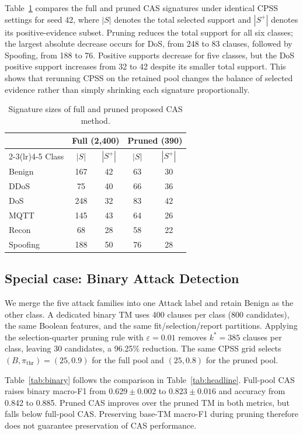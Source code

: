 \documentclass[conference]{IEEEtran}
\begin{document}
Table~\ref{tab:reduction} compares the full and pruned CAS signatures
under identical CPSS settings for seed 42, where $|S|$ denotes the
total selected support and $|S^+|$ denotes its positive-evidence subset.
Pruning reduces the total support for all six classes; the largest
absolute decrease occurs for DoS, from 248 to 83 clauses, followed by
Spoofing, from 188 to 76. Positive supports decrease for five classes,
but the DoS positive support increases from 32 to 42 despite its smaller
total support. This shows that rerunning CPSS on the retained pool
changes the balance of selected evidence rather than simply shrinking
each signature proportionally.

\begin{table}[!htb]
\centering
\caption{Signature sizes of full and pruned proposed CAS method.}
\label{tab:reduction}
\footnotesize
\begin{tabular}{@{}lcccc@{}}
\toprule
& \multicolumn{2}{c}{Full (2,400)} & \multicolumn{2}{c}{Pruned (390)} \\
\cmidrule(lr){2-3}\cmidrule(lr){4-5}
Class & $|S|$ & $|S^+|$ & $|S|$ & $|S^+|$ \\
\midrule
Benign & 167 & 42 & 63 & 30 \\
DDoS & 75 & 40 & 66 & 36 \\
DoS & 248 & 32 & 83 & 42 \\
MQTT & 145 & 43 & 64 & 26 \\
Recon & 68 & 28 & 58 & 22 \\
Spoofing & 188 & 50 & 76 & 28 \\
\bottomrule
\end{tabular}
\end{table}

\subsection{Special case: Binary Attack Detection}
\begingroup
\color{blue}
\label{sec:binary}
We merge the five attack families into one Attack label and retain
Benign as the other class. A dedicated binary TM uses 400 clauses
per class (800 candidates), the same Boolean features, and the same
fit/selection/report partitions. Applying the selection-quarter pruning
rule with $\varepsilon=0.01$ removes $k^*=385$ clauses per class,
leaving 30 candidates, a 96.25\% reduction. The same CPSS grid selects
$(B,\pi_{\mathrm{thr}})=(25,0.9)$ for the full pool and $(25,0.8)$
for the pruned pool.

Table~\ref{tab:binary} follows the comparison in
Table~\ref{tab:headline}. Full-pool CAS raises binary macro-F1 from
$0.629\pm0.002$ to $0.823\pm0.016$ and accuracy from 0.842 to
0.885. Pruned CAS improves over the pruned TM in both metrics, but
falls below full-pool CAS. Preserving base-TM macro-F1 during pruning
therefore does not guarantee preservation of CAS performance.
\end{document}
